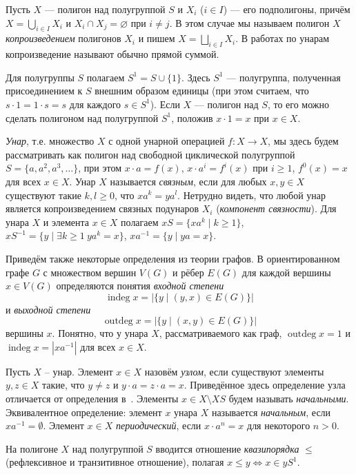 \documentclass[11pt,twoside,final
]{article}
\def\indeg{\operatorname{indeg}}
\def\outdeg{\operatorname{outdeg}}
\begin{document}
Пусть $X$ — полигон над полугруппой $S$ и $X_i$ ($i \in I$) — его подполигоны, причём $X = \bigcup_{i \in I} X_{i}$ и $X_{i} \cap X_{j} = \varnothing$ при $i \neq j$.
В этом случае мы называем полигон $X$ \textit{копроизведением} полигонов $X_i$ и пишем $X = \bigsqcup_{i \in I} X_{i}$.
В работах по унарам копроизведение называют обычно прямой суммой.

Для полугруппы $S$ полагаем $S^1 = S \cup \{ 1 \}$.
Здесь $S^1$ — полугруппа, полученная присоединением к $S$ внешним образом единицы (при этом считаем, что $s \cdot 1 = 1 \cdot s = s$ для каждого $s \in S^1$).
Если $X$ — полигон над $S$, то его можно сделать полигоном над полугруппой $S^1$, положив $x \cdot 1 = x$ при $x \in X$.

\textit{Унар}, т.е. множество $X$ с одной унарной операцией $f: X \to X$, мы здесь будем рассматривать как полигон над свободной циклической полугруппой $S = \{ a,a^{2},a^{3},\ldots\}$, при этом $x \cdot a = f(x)$, $x \cdot a^i = f^i (x)$ при $i \geqslant 1$, $f^0(x) = x$ для всех $x \in X$.
Унар $X$ называется \textit{связным}, если для любых $x,y \in X$ существуют такие $k,l \geqslant 0$, что $x a^k = y a^l$.
Нетрудно видеть, что любой унар является копроизведением связных подунаров $X_i$ (\textit{компонент связности}).
Для унара $X$ и элемента $x \in X$ полагаем $xS = \{ xa^k \mid k \geqslant 1 \}$, $xS^{-1} = \{ y \mid \exists k \geqslant 1 \ y a^k = x \}$, $xa^{-1} = \{ y \mid ya = x \}$.

Приведём также некоторые определения из теории графов.
В ориентированном графе $G$ с множеством вершин $V(G)$ и рёбер $E(G)$ для каждой вершины $x \in V(G)$ определяются понятия \textit{входной степени}
\[
	\indeg x = |\{ y \mid (y,x) \in E(G) \}|
\]
и \textit{выходной степени}
\[
	\outdeg x = |\{ y \mid (x,y) \in E(G) \}|
\]
вершины $x$.
Понятно, что у унара $X$, рассматриваемого как граф, $\outdeg x = 1$ и $\indeg x = |xa^{-1}|$ для всех $x \in X$.

Пусть $X$ -- унар.
Элемент $x \in X$ назовём \textit{узлом}, если существуют элементы $y,z \in X$ такие, что $y \neq z$ и $y \cdot a = z \cdot a = x$.
Приведённое здесь определение узла отличается от определения в~\cite{Kozhukhov_8}.
Элементы $x \in X \setminus XS$ будем называть \textit{начальными}.
Эквивалентное определение: элемент $x$ унара $X$ называется \textit{начальным}, если $x a^{-1} = \emptyset$.
Элемент $x \in X$ \textit{периодический}, если $x \cdot a^n = x$ для некоторого $n > 0$.

На полигоне $X$ над полугруппой $S$ вводится отношение \textit{квазипорядка} $\leqslant$ (рефлексивное и транзитивное отношение), полагая $x \leqslant y \Leftrightarrow x \in y S^1$.
\end{document}
